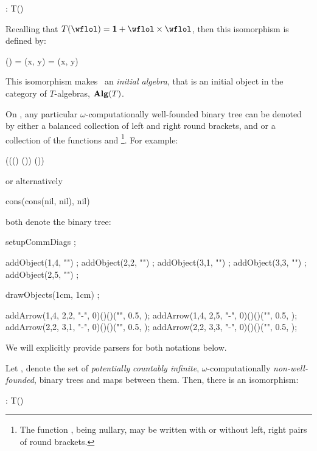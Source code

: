 \placesubformula\startformula
  \alpha : T(\wflol) \longRightIsoArrow \wflol
\stopformula

\noindent Recalling that $T(\wflol) = \bold{1} + \wflol \times \wflol$, 
then this isomorphism is defined by: 

\placeformula[+]\startformula\startalign
  \NC \alpha(\star) \NC =         \NR
  \NC \alpha(x, y)  \NC = (x, y) \NR
\stopalign\stopformula

\noindent This isomorphism makes \wflol\ an \emph{initial algebra}, 
that is an initial object in the category of $T$-algebras, 
$\bold{Alg}(T)$.

On , any particular $\omega$-computationally well-founded 
binary tree can be denoted by either a balanced collection of left and 
right round brackets, \quote{(} and \quote{)} or a collection of the 
functions  and \footnote{The function , 
being nullary, may be written with or without left, right pairs of round 
brackets.}. For example: 

\placeformula[+]\startformula\starttyping
((() ()) ())
\stoptyping\stopformula

\noindent or alternatively 

\placeformula[+]\startformula\starttyping
cons(cons(nil, nil), nil)
\stoptyping\stopformula

\noindent both denote the binary tree:

\placeformula[+]\startformula{}
  setupCommDiags ;
  
  addObject(1,4, "") ;
  addObject(2,2, "") ;
  addObject(3,1, "") ;
  addObject(3,3, "") ;
  addObject(2,5, "") ;
  
  drawObjects(1cm, 1cm) ;
  
  addArrow(1,4, 2,2, "-", 0)()()("", 0.5, );
  addArrow(1,4, 2,5, "-", 0)()()("", 0.5, );
  addArrow(2,2, 3,1, "-", 0)()()("", 0.5, );
  addArrow(2,2, 3,3, "-", 0)()()("", 0.5, );

\stopMPcode\stopformula

\noindent We will explicitly provide parsers for both notations below. 

Let \lol, denote the set of \emph{potentially} \emph{countably infinite}, 
$\omega$-computationally \emph{non-well-founded}, binary trees and maps 
between them. Then, there is an isomorphism: 

\placesubformula\startformula
  \zeta : \lol \longRightIsoArrow T(\lol)
\stopformula

